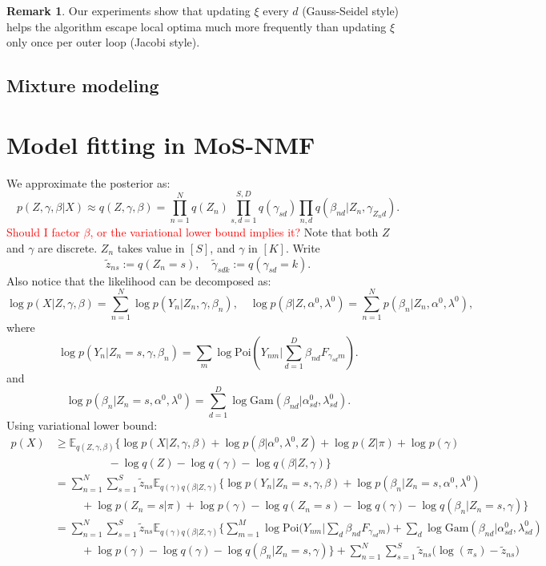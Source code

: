 \documentclass[11pt,twoside]{article}
\newcommand{\Ebb}{\ensuremath{\mathbb{E}}}
\theoremstyle{plain}
\numberwithin{theorem}{section}
\numberwithin{proposition}{section}
\numberwithin{lemma}{section}
\numberwithin{definition}{section}
\numberwithin{condition}{section}
\numberwithin{problem}{section}
\numberwithin{corollary}{section}
\numberwithin{assumption}{section}
\numberwithin{example}{section}
\numberwithin{conjecture}{section}
\theoremstyle{definition}
\newtheorem{remark}{Remark}
\numberwithin{remark}{section}
\begin{document}
\begin{remark}
Our experiments show that updating $\xi$ every $d$ (Gauss-Seidel style) helps the algorithm escape local optima much more frequently than updating $\xi$ only once per outer loop (Jacobi style).
\end{remark}

\subsection{Mixture modeling}

\section{Model fitting in MoS-NMF}
We approximate the posterior as: 
$$p(Z, \gamma, \beta | X) \approx q(Z, \gamma, \beta) =  \prod_{n=1}^{N} q(Z_n) \prod_{s, d = 1}^{S, D} q(\gamma_{sd}) \prod_{n, d} q(\beta_{nd} | Z_n, \gamma_{Z_n d}).$$
\textcolor{red}{Should I factor $\beta$, or the variational lower bound implies it?}
Note that both $Z$ and $\gamma$ are discrete. $Z_n$ takes value in $[S]$, and $\gamma$ in $[K]$. Write 
$$\tilde{z}_{ns} := q(Z_n = s), \quad \tilde{\gamma}_{sdk} := q(\gamma_{sd} = k). $$
Also notice that the likelihood can be decomposed as:
$$\log p(X | Z, \gamma, \beta) = \sum_{n=1}^{N} \log p(Y_n | Z_n, \gamma, \beta_n), \quad \log p(\beta | Z, \alpha^{0}, \lambda^{0}) = \sum_{n=1}^{N} p(\beta_n | Z_n, \alpha^{0}, \lambda^{0}),$$
where
$$\log p(Y_n | Z_n = s, \gamma, \beta_n) = \sum_{m} \log \mathrm{Poi}(Y_{nm} | \sum_{d=1}^{D} \beta_{nd} F_{\gamma_{sd}m}).$$
and 
$$\log p(\beta_n | Z_n = s, \alpha^{0}, \lambda^{0}) = \sum_{d = 1}^{D} \log\mathrm{Gam}(\beta_{nd} | \alpha^{0}_{sd}, \lambda^{0}_{sd}).$$
Using variational lower bound:
\begin{align*}
p(X) & \geq \Ebb_{q(Z, \gamma, \beta)} \big\{\log p(X|  Z, \gamma, \beta) + \log p(\beta | \alpha^{0}, \lambda^{0}, Z) + \log p(Z | \pi) + \log p(\gamma) \\
& \hspace{2cm} - \log q(Z) - \log q(\gamma) - \log q(\beta | Z, \gamma) \big\}\\
& = \sum_{n=1}^{N} \sum_{s=1}^{S} \tilde{z}_{ns} \Ebb_{q(\gamma) q(\beta | Z, \gamma)} \big\{\log p(Y_n| Z_n = s, \gamma, \beta) + \log p(\beta_n |Z_n = s, \alpha^{0}, \lambda^{0}) \\
& \hspace{1cm}  + \log p(Z_n = s| \pi) + \log p(\gamma) - \log q(Z_n = s) - \log q(\gamma) - \log q(\beta_n | Z_n = s, \gamma) \big\}\\
& = \sum_{n=1}^{N} \sum_{s=1}^{S} \tilde{z}_{ns} \Ebb_{q(\gamma) q(\beta | Z, \gamma)} \bigg\{ \sum_{m=1}^{M} \log \mathrm{Poi}\big(Y_{nm}| \sum_{d} \beta_{nd} F_{\gamma_{sd}m} \big) + \sum_{d} \log \mathrm{Gam}(\beta_{nd} |\alpha^{0}_{sd}, \lambda^{0}_{sd}) \\
& \hspace{1cm}  + \log p(\gamma) - \log q(\gamma) - \log q(\beta_n | Z_n = s, \gamma) \bigg\} + \sum_{n=1}^{N} \sum_{s=1}^{S} \tilde{z}_{ns} \big(\log(\pi_s) - \tilde{z}_{ns} \big)
\end{align*}
\end{document}
